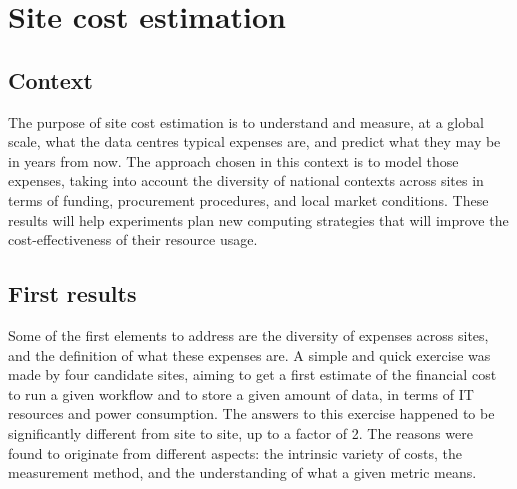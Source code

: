 \section{Site cost estimation}

\subsection{Context}

The purpose of site cost estimation is to understand and measure, at a
global scale, what the data centres typical expenses are, and predict
what they may be in years from now.  The approach chosen in this
context is to model those expenses, taking into account the diversity
of national contexts across sites in terms of funding, procurement
procedures, and local market conditions.  These results will help
experiments plan new computing strategies that will improve the
cost-effectiveness of their resource usage.

\subsection{First results}

Some of the first elements to address are the diversity of expenses
across sites, and the definition of what these expenses are.  A simple
and quick exercise was made by four candidate sites, aiming to get a
first estimate of the financial cost to run a given workflow and to
store a given amount of data, in terms of IT resources and power
consumption.  The answers to this exercise happened to be
significantly different from site to site, up to a factor of 2.  The
reasons were found to originate from different aspects: the intrinsic
variety of costs, the measurement method, and the understanding of
what a given metric means.

